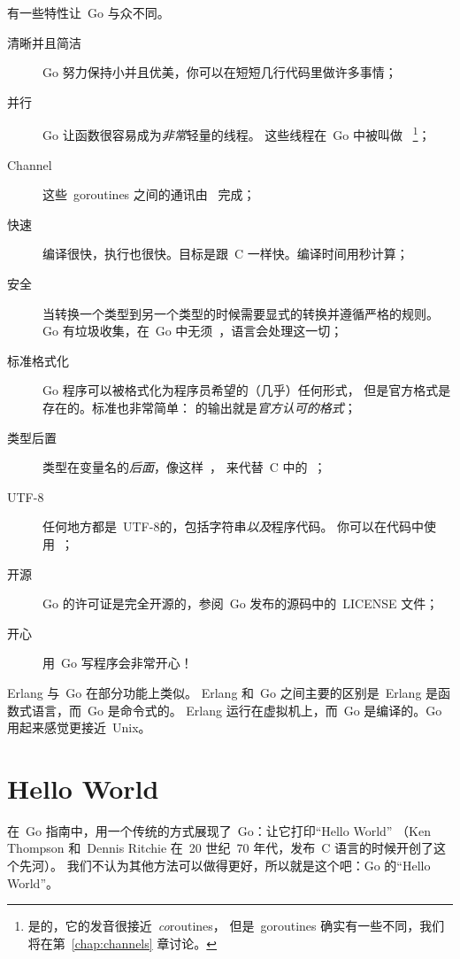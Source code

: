 有一些特性让~Go 与众不同。
\begin{description}
\item[清晰并且简洁]
Go 努力保持小并且优美，你可以在短短几行代码里做许多事情；

\item[并行]
Go 让函数很容易成为\emph{非常}轻量的线程。
这些线程在~Go 中被叫做~ 
\footnote{是的，它的发音很接近~\emph{co}routines，
但是~goroutines 确实有一些不同，我们将在第~\ref{chap:channels} 章讨论。}；

\item[Channel]
这些~goroutines 之间的通讯由~\cite{hoare, csp} 完成；

\item[快速]
编译很快，执行也很快。目标是跟~C 一样快。编译时间用秒计算；

\item[安全]
当转换一个类型到另一个类型的时候需要显式的转换并遵循严格的规则。
Go 有垃圾收集，在~Go 中无须~，语言会处理这一切；

\item[标准格式化]
Go 程序可以被格式化为程序员希望的（几乎）任何形式，
但是官方格式是存在的。标准也非常简单：
 的输出就是\emph{官方认可的格式}；

\item[类型后置]
类型在变量名的\emph{后面}，像这样~，
来代替~C 中的~；

\item[UTF-8]
任何地方都是~UTF-8的，包括字符串\emph{以及}程序代码。 
你可以在代码中使用~；

\item[开源]
Go 的许可证是完全开源的，参阅~Go 发布的源码中的~LICENSE 文件；

\item[开心]
用~Go 写程序会非常开心！

\end{description}
Erlang\cite{erlang} 与~Go 在部分功能上类似。
Erlang 和~Go 之间主要的区别是~Erlang 是函数式语言，而~Go 是命令式的。
Erlang 运行在虚拟机上，而~Go 是编译的。Go 用起来感觉更接近~Unix。

\section{Hello World}
\label{sec:hello world}
在~Go 指南中，用一个传统的方式展现了~Go：让它打印``Hello World''
（Ken Thompson 和~Dennis Ritchie 在~20 世纪~70 年代，发布~C 语言的时候开创了这个先河）。
我们不认为其他方法可以做得更好，所以就是这个吧：Go 的``Hello World''。

